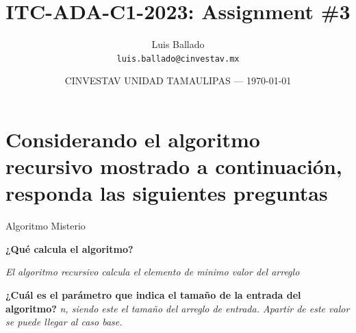 \documentclass{article}
\title{ITC-ADA-C1-2023: Assignment \#3} %
\author{Luis Ballado\\ \texttt{luis.ballado@cinvestav.mx}} %
\date{CINVESTAV UNIDAD TAMAULIPAS --- \today} %
\begin{document}
\maketitle %


\section{Considerando el algoritmo recursivo mostrado a continuación, responda las siguientes preguntas}

\begin{center}
  \begin{minipage}{0.7\linewidth} %
    \begin{algorithm}[H] 
      \DontPrintSemicolon
      \caption{Algoritmo Misterio}
      \label{alg:loop}
    \end{algorithm}
  \end{minipage}
\end{center}

\begin{question}
  \textbf{¿Qué calcula el algoritmo?}
  
  \textit{El algoritmo recursivo calcula el elemento de minimo valor del arreglo}
    
\end{question}

\begin{question}
  \textbf{¿Cuál es el parámetro que indica el tamaño de la entrada del algoritmo?}
  \textit{n, siendo este el tamaño del arreglo de entrada. Apartir de este valor se puede llegar al caso base.}
    
\end{question}
\end{document}
